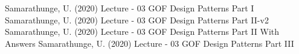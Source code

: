\documentclass[12pt]{scrartcl} %
\begin{document}
\pagebreak
\newpage
\begin{thebibliography}{00}
	\raggedright
	 Samarathunge, U. (2020) Lecture - 03 GOF Design Patterns Part I
     Samarathunge, U. (2020) Lecture - 03 GOF Design Patterns Part II-v2
     Samarathunge, U. (2020) Lecture - 03 GOF Design Patterns Part II With Answers
     Samarathunge, U. (2020) Lecture - 03 GOF Design Patterns Part III
\end{thebibliography}
\end{document}
